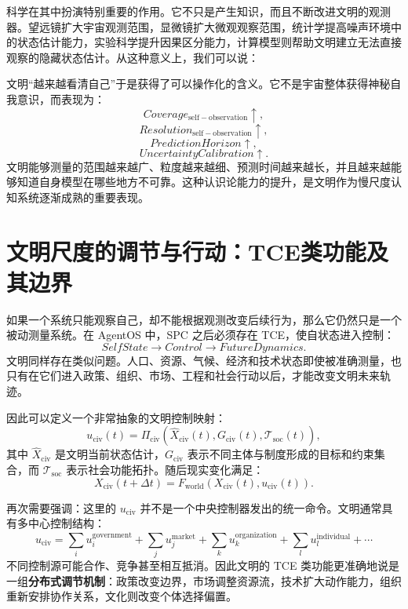 科学在其中扮演特别重要的作用。它不只是产生知识，而且不断改进文明的观测器。望远镜扩大宇宙观测范围，显微镜扩大微观观察范围，统计学提高噪声环境中的状态估计能力，实验科学提升因果区分能力，计算模型则帮助文明建立无法直接观察的隐藏状态估计。从这种意义上，我们可以说：
\begin{statementbox}
\centering
{}
\end{statementbox}

文明“越来越看清自己”于是获得了可以操作化的含义。它不是宇宙整体获得神秘自我意识，而表现为：
\[
Coverage_{\mathrm{self-observation}}\uparrow,
\]
\[
Resolution_{\mathrm{self-observation}}\uparrow,
\]
\[
PredictionHorizon\uparrow,
\]
\[
UncertaintyCalibration\uparrow.
\]
文明能够测量的范围越来越广、粒度越来越细、预测时间越来越长，并且越来越能够知道自身模型在哪些地方不可靠。这种认识论能力的提升，是文明作为慢尺度认知系统逐渐成熟的重要表现。

\section{文明尺度的调节与行动：TCE类功能及其边界}

如果一个系统只能观察自己，却不能根据观测改变后续行为，那么它仍然只是一个被动测量系统。在 AgentOS 中，SPC 之后必须存在 TCE，使自状态进入控制：
\[
SelfState
\rightarrow
Control
\rightarrow
FutureDynamics.
\]
文明同样存在类似问题。人口、资源、气候、经济和技术状态即使被准确测量，也只有在它们进入政策、组织、市场、工程和社会行动以后，才能改变文明未来轨迹。

因此可以定义一个非常抽象的文明控制映射：
\[
u_{\mathrm{civ}}(t)
=
\Pi_{\mathrm{civ}}
\left(
\hat X_{\mathrm{civ}}(t),
G_{\mathrm{civ}}(t),
\mathcal T_{\mathrm{soc}}(t)
\right),
\]
其中 $\hat X_{\mathrm{civ}}$ 是文明当前状态估计，$G_{\mathrm{civ}}$ 表示不同主体与制度形成的目标和约束集合，而 $\mathcal T_{\mathrm{soc}}$ 表示社会功能拓扑。随后现实变化满足：
\[
X_{\mathrm{civ}}(t+\Delta t)
=
F_{\mathrm{world}}
\left(
X_{\mathrm{civ}}(t),
u_{\mathrm{civ}}(t)
\right).
\]

再次需要强调：这里的 $u_{\mathrm{civ}}$ 并不是一个中央控制器发出的统一命令。文明通常具有多中心控制结构：
\[
u_{\mathrm{civ}}
=
\sum_i
u_i^{\mathrm{government}}
+
\sum_j
u_j^{\mathrm{market}}
+
\sum_k
u_k^{\mathrm{organization}}
+
\sum_l
u_l^{\mathrm{individual}}
+\cdots
\]
不同控制源可能合作、竞争甚至相互抵消。因此文明的 TCE 类功能更准确地说是一组\textbf{分布式调节机制}：政策改变边界，市场调整资源流，技术扩大动作能力，组织重新安排协作关系，文化则改变个体选择偏置。


